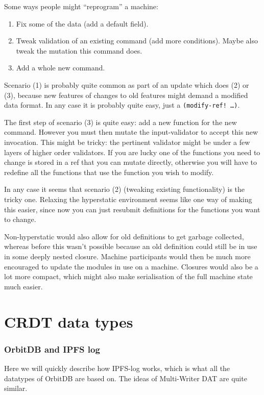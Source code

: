 \documentclass[a4paper, oneside, 10pt]{amsart}
\begin{document}
Some ways people might ``reprogram'' a machine:
\begin{enumerate}
\item
  Fix some of the data (add a default field).
\item
  Tweak validation of an existing command (add more conditions). Maybe
  also tweak the mutation this command does.
\item
  Add a whole new command.
\end{enumerate}

Scenario (1) is probably quite common as part of an update which does
(2) or (3), because new features of changes to old features might demand
a modified data format. In any case it is probably quite easy, just a
\texttt{(modify-ref! \ldots)}.

The first step of scenario (3) is quite easy: add a new function for the new
command. However you must then mutate the input-validator to accept this new
invocation. This might be tricky: the pertinent validator might be under a few
layers of higher order validators. If you are lucky one of the functions you
need to change is stored in a ref that you can mutate directly, otherwise you
will have to redefine all the functions that use the function you wish to
modify.

In any case it seems that scenario (2) (tweaking existing functionality) is the
tricky one. Relaxing the hyperstatic environment seems like one way of making
this easier, since now you can just resubmit definitions for the functions you
want to change.

Non-hyperstatic would also allow for old definitions to get garbage collected,
whereas before this wasn't possible because an old definition could still be in
use in some deeply nested closure. Machine participants would then be much more
encouraged to update the modules in use on a machine. Closures would also be a
lot more compact, which might also make serialisation of the full machine state
much easier.

\section{CRDT data types}

\subsubsection{OrbitDB and IPFS log}

Here we will quickly describe how IPFS-log works, which is what all the
datatypes of OrbitDB are based on. The ideas of Multi-Writer DAT are quite
similar.
\end{document}

